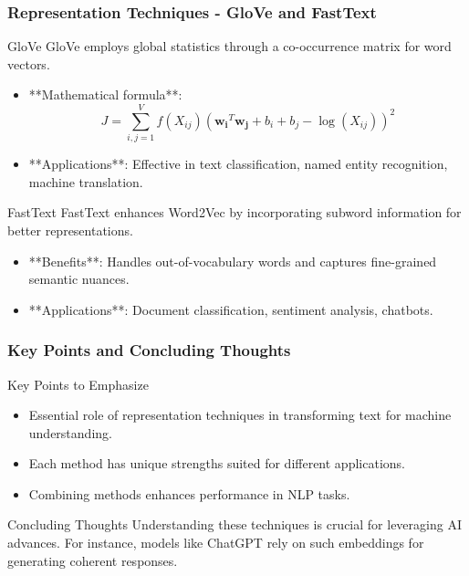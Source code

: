 \documentclass[aspectratio=169]{beamer}
\begin{document}
\begin{frame}[fragile]
    \frametitle{Representation Techniques - GloVe and FastText}
    \begin{block}{GloVe}
        GloVe employs global statistics through a co-occurrence matrix for word vectors.
    \end{block}
    \begin{itemize}
        \item **Mathematical formula**:
        \begin{equation}
            J = \sum_{i,j=1}^{V} f(X_{ij}) \left( \mathbf{w_i}^T \mathbf{w_j} + b_i + b_j - \log(X_{ij}) \right)^2
        \end{equation}
        \item **Applications**: Effective in text classification, named entity recognition, machine translation.
    \end{itemize}

    \begin{block}{FastText}
        FastText enhances Word2Vec by incorporating subword information for better representations.
    \end{block}
    \begin{itemize}
        \item **Benefits**: Handles out-of-vocabulary words and captures fine-grained semantic nuances.
        \item **Applications**: Document classification, sentiment analysis, chatbots.
    \end{itemize}
\end{frame}

\begin{frame}[fragile]
    \frametitle{Key Points and Concluding Thoughts}
    \begin{block}{Key Points to Emphasize}
        \begin{itemize}
            \item Essential role of representation techniques in transforming text for machine understanding.
            \item Each method has unique strengths suited for different applications.
            \item Combining methods enhances performance in NLP tasks.
        \end{itemize}
    \end{block}
    \begin{block}{Concluding Thoughts}
        Understanding these techniques is crucial for leveraging AI advances. For instance, models like ChatGPT rely on such embeddings for generating coherent responses.
    \end{block}
\end{frame}
\end{document}
